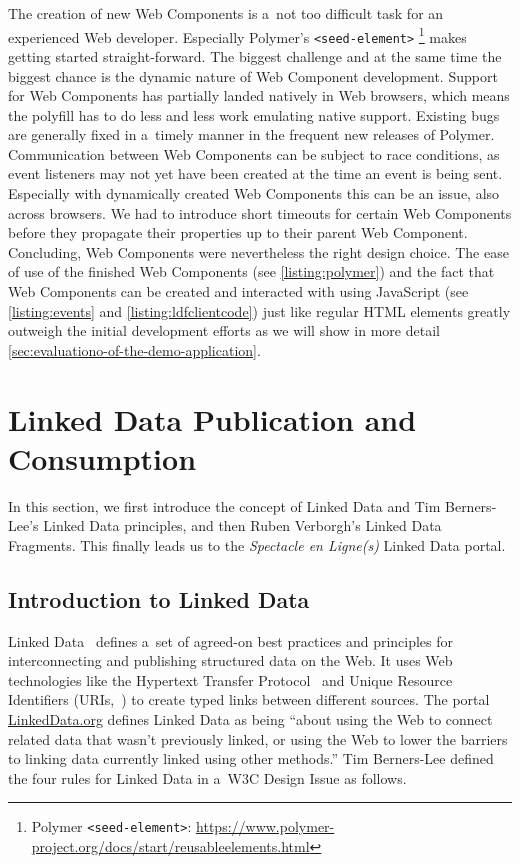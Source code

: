 \documentclass[runningheads,a4paper]{llncs}
\begin{document}
The creation of new Web Components is a~not too difficult task
for an experienced Web developer.
Especially Polymer's \texttt{<seed-element>}%
\footnote{Polymer \texttt{<seed-element>}:
\url{https://www.polymer-project.org/docs/start/reusableelements.html}}
makes getting started straight-forward.
The biggest challenge and at the same time the biggest chance
is the dynamic nature of Web Component development.
Support for Web Components has partially landed natively in Web browsers,
which means the polyfill has to do less and less work emulating native support.
Existing bugs are generally fixed in a~timely manner in the frequent new releases of Polymer.
Communication between Web Components can be subject to race conditions,
as event listeners may not yet have been created at the time an event is being sent.
Especially with dynamically created Web Components this can be an issue,
also across browsers.
We had to introduce short timeouts for certain Web Components
before they propagate their properties up to their parent Web Component.
Concluding, Web Components were nevertheless the right design choice.
The ease of use of the finished Web Components (see \autoref{listing:polymer})
and the fact that Web Components can be created and interacted with using JavaScript
(see \autoref{listing:events} and \autoref{listing:ldfclientcode})
just like regular HTML elements greatly outweigh the initial development efforts
as we will show in more detail \autoref{sec:evaluationo-of-the-demo-application}.


\section{Linked Data Publication and Consumption}
\label{sec:linked-data-publication-and-consumption}

In this section, we first introduce the concept of Linked Data
and Tim Berners-Lee's Linked Data principles,
and then Ruben Verborgh's Linked Data Fragments.
This finally leads us to the \emph{Spectacle en Ligne(s)} Linked Data portal.

\subsection{Introduction to Linked Data}

Linked Data~\cite{bernerslee2006linkeddata} defines a~set of agreed-on
best practices and principles for interconnecting and publishing structured data on the Web.
It uses Web technologies like the Hypertext Transfer Protocol~\cite{fielding1999http}
and Unique Resource Identifiers (URIs,~\cite{bernerslee2005uri})
to create typed links between different sources.
The portal \url{LinkedData.org} defines Linked Data as being
``about using the Web to connect related data that wasn't previously linked,
or using the Web to lower the barriers to linking data currently linked using other methods.''
Tim Berners-Lee defined the four rules for Linked Data in a~W3C Design Issue as follows.
\end{document}
